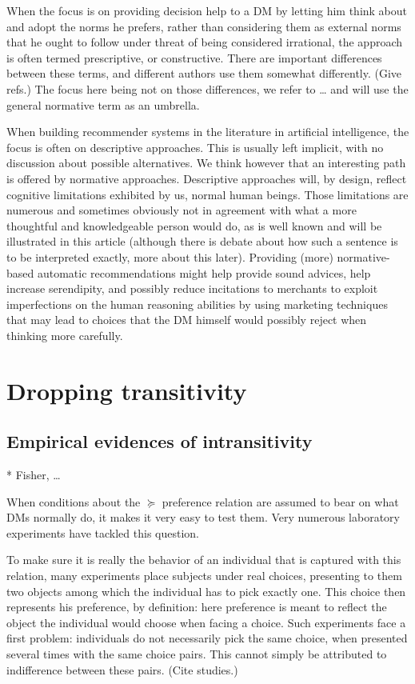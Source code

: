 \documentclass[french, english]{llncs}
\begin{document}
When the focus is on providing decision help to a \ac{DM} by letting him think about and adopt the norms he prefers, rather than considering them as external norms that he ought to follow under threat of being considered irrational, the approach is often termed prescriptive, or constructive. There are important differences between these terms, and different authors use them somewhat differently. (Give refs.) The focus here being not on those differences, we refer to … and will use the general normative term as an umbrella.

When building recommender systems in the literature in artificial intelligence, the focus is often on descriptive approaches. This is usually left implicit, with no discussion about possible alternatives. We think however that an interesting path is offered by normative approaches. Descriptive approaches will, by design, reflect cognitive limitations exhibited by us, normal human beings. Those limitations are numerous and sometimes obviously not in agreement with what a more thoughtful and knowledgeable person would do, as is well known and will be illustrated in this article (although there is debate about how such a sentence is to be interpreted exactly, more about this later). Providing (more) normative-based automatic recommendations might help provide sound advices, help increase serendipity, and possibly reduce incitations to merchants to exploit imperfections on the human reasoning abilities by using marketing techniques that may lead to choices that the \ac{DM} himself would possibly reject when thinking more carefully.

\section{Dropping transitivity}

\subsection{Empirical evidences of intransitivity}

* Fisher, \ldots {}

When conditions about the $\succeq$ preference relation are assumed to bear on what \acp{DM} normally do, it makes it very easy to test them. Very numerous laboratory experiments have tackled this question.

To make sure it is really the behavior of an individual that is captured with this relation, many experiments place subjects under real choices, presenting to them two objects among which the individual has to pick exactly one. This choice then represents his preference, by definition: here preference is meant to reflect the object the individual would choose when facing a choice. Such experiments face a first problem: individuals do not necessarily pick the same choice, when presented several times with the same choice pairs. This cannot simply be attributed to indifference between these pairs. (Cite studies.)
\end{document}
